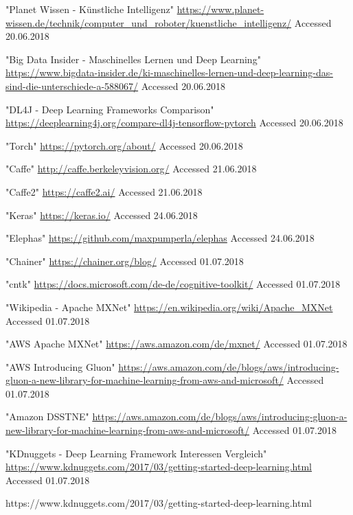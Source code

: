 \documentclass[journal]{IEEEtran}
\begin{document}
\begin{thebibliography}{1}
"Planet Wissen - Künstliche Intelligenz"
\url{https://www.planet-wissen.de/technik/computer_und_roboter/kuenstliche_intelligenz/} 
Accessed 20.06.2018

"Big Data Insider - Maschinelles Lernen und Deep Learning"
\url{https://www.bigdata-insider.de/ki-maschinelles-lernen-und-deep-learning-das-sind-die-unterschiede-a-588067/} 
Accessed 20.06.2018

"DL4J - Deep Learning Frameworks Comparison"
\url{https://deeplearning4j.org/compare-dl4j-tensorflow-pytorch}
Accessed 20.06.2018

"Torch"
\url{https://pytorch.org/about/}
Accessed 20.06.2018

"Caffe"
\url{http://caffe.berkeleyvision.org/}
Accessed 21.06.2018

"Caffe2"
\url{https://caffe2.ai/}
Accessed 21.06.2018

"Keras"
\url{https://keras.io/}
Accessed 24.06.2018

"Elephas"
\url{https://github.com/maxpumperla/elephas}
Accessed 24.06.2018

"Chainer"
\url{https://chainer.org/blog/}
Accessed 01.07.2018

"\acf{cntk}"
\url{https://docs.microsoft.com/de-de/cognitive-toolkit/}
Accessed 01.07.2018

"Wikipedia - Apache MXNet"
\url{https://en.wikipedia.org/wiki/Apache_MXNet}
Accessed 01.07.2018

"AWS Apache MXNet"
\url{https://aws.amazon.com/de/mxnet/}
Accessed 01.07.2018

"AWS Introducing Gluon"
\url{https://aws.amazon.com/de/blogs/aws/introducing-gluon-a-new-library-for-machine-learning-from-aws-and-microsoft/}
Accessed 01.07.2018

"Amazon DSSTNE"
\url{https://aws.amazon.com/de/blogs/aws/introducing-gluon-a-new-library-for-machine-learning-from-aws-and-microsoft/}
Accessed 01.07.2018

"KDnuggets - Deep Learning Framework Interessen Vergleich"
\url{https://www.kdnuggets.com/2017/03/getting-started-deep-learning.html}
Accessed 01.07.2018

https://www.kdnuggets.com/2017/03/getting-started-deep-learning.html

\end{thebibliography}
\end{document}
